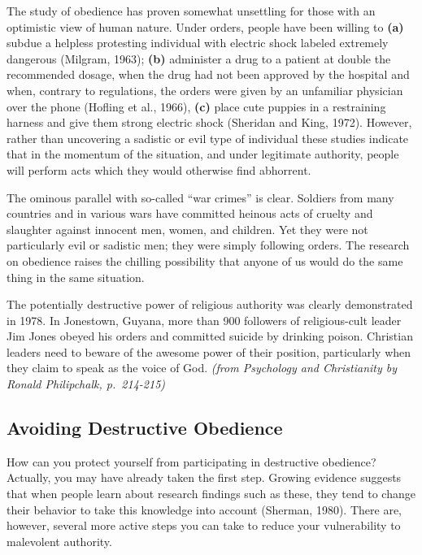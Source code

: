 \documentclass[
]{book}
\begin{document}
The study of obedience has proven somewhat unsettling for those with an optimistic view of human nature. Under orders, people have been willing to \textbf{(a)} subdue a helpless protesting individual with electric shock labeled extremely dangerous (Milgram, 1963); \textbf{(b)} administer a drug to a patient at double the recommended dosage, when the drug had not been approved by the hospital and when, contrary to regulations, the orders were given by an unfamiliar physician over the phone (Hofling et al., 1966), \textbf{(c)} place cute puppies in a restraining harness and give them strong electric shock (Sheridan and King, 1972). However, rather than uncovering a sadistic or evil type of individual these studies indicate that in the momentum of the situation, and under legitimate authority, people will perform acts which they would otherwise find abhorrent.

The ominous parallel with so-called ``war crimes'' is clear. Soldiers from many countries and in various wars have committed heinous acts of cruelty and slaughter against innocent men, women, and children. Yet they were not particularly evil or sadistic men; they were simply following orders. The research on obedience raises the chilling possibility that anyone of us would do the same thing in the same situation.

The potentially destructive power of religious authority was clearly demonstrated in 1978. In Jonestown, Guyana, more than 900 followers of religious-cult leader Jim Jones obeyed his orders and committed suicide by drinking poison. Christian leaders need to beware of the awesome power of their position, particularly when they claim to speak as the voice of God. \emph{(from Psychology and Christianity by Ronald Philipchalk, p.~214-215)}

\hypertarget{avoiding-destructive-obedience}{%
\subsection*{Avoiding Destructive Obedience}\label{avoiding-destructive-obedience}}

How can you protect yourself from participating in destructive obedience? Actually, you may have already taken the first step. Growing evidence suggests that when people learn about research findings such as these, they tend to change their behavior to take this knowledge into account (Sherman, 1980). There are, however, several more active steps you can take to reduce your vulnerability to malevolent authority.
\end{document}
